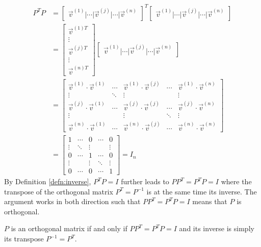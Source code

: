 \begin{align*}
P^TP &= 
\begin{bmatrix}
\vec{v}^{(1)}|\cdots|\vec{v}^{(j)}|\cdots|\vec{v}^{(n)}   
\end{bmatrix}^T
\begin{bmatrix}
\vec{v}^{(1)}|\cdots|\vec{v}^{(j)}|\cdots|\vec{v}^{(n)}   
\end{bmatrix} \\
&= 
\left[
\begin{array}{c}
\vec{v}^{(1)T}\\
\hline
\vdots \\
\hline
\vec{v}^{(j)T} \\
\hline
\vdots \\
\hline
\vec{v}^{(n)T}  
\end{array}
\right]
\begin{bmatrix}
\vec{v}^{(1)}|\cdots|\vec{v}^{(j)}|\cdots|\vec{v}^{(n)}
\end{bmatrix} \\ 
&=
\begin{bmatrix}
\vec{v}^{(1)} \cdot \vec{v}^{(1)} & \cdots & \vec{v}^{(1)} \cdot \vec{v}^{(j)} & \cdots & \vec{v}^{(1)} \cdot \vec{v}^{(n)} \\
\vdots & \ddots & \vdots & & \vdots \\
\vec{v}^{(j)} \cdot \vec{v}^{(1)} & \cdots & \vec{v}^{(j)} \cdot \vec{v}^{(j)} & \cdots & \vec{v}^{(j)} \cdot \vec{v}^{(n)} \\
\vdots & & \vdots & \ddots & \vdots \\
\vec{v}^{(n)} \cdot \vec{v}^{(1)} & \cdots & \vec{v}^{(n)} \cdot \vec{v}^{(j)} & \cdots & \vec{v}^{(n)} \cdot \vec{v}^{(n)}
\end{bmatrix} \\
&=
\begin{bmatrix}
1 & \cdots & 0 & \cdots & 0 \\
\vdots & \ddots & \vdots & & \vdots \\
0 & \cdots & 1 & \cdots & 0 \\
\vdots & & \vdots & \ddots & \vdots \\
0 & \cdots & 0 & \cdots & 1
\end{bmatrix} = I_n
\end{align*}
By Definition \ref{defn:inverse}, $P^TP = I$ further leads to $PP^T = P^TP = I$ where the transpose of the orthogonal matrix $P^T = P^{-1}$ is at the same time its inverse. The argument works in both direction such that $PP^T = P^TP = I$ means that $P$ is orthogonal.
\begin{proper}
\label{proper:orthoinvT}
$P$ is an orthogonal matrix if and only if $PP^T = P^TP = I$ and its inverse is simply its transpose $P^{-1} = P^T$.
\end{proper}

